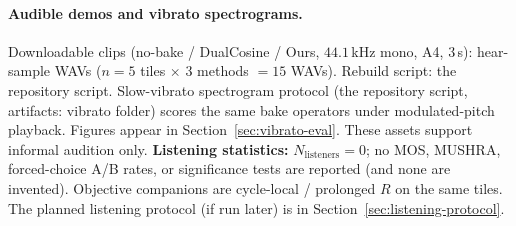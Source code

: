 
\paragraph{Audible demos and vibrato spectrograms.}
Downloadable clips (no-bake / DualCosine / Ours, $44.1$\,kHz mono, A4, $3$\,s):
hear-sample WAVs
($n{=}5$ tiles $\times$ $3$ methods $=15$ WAVs).
Rebuild script:
the repository script.
Slow-vibrato spectrogram protocol
(the repository script,
artifacts:
vibrato folder)
scores the same bake operators under modulated-pitch playback. Figures appear in Section~\ref{sec:vibrato-eval}.
These assets support informal audition only.
\textbf{Listening statistics:} $N_{\mathrm{listeners}}{=}0$; no MOS, MUSHRA, forced-choice A/B rates, or significance tests are reported (and none are invented).
Objective companions are cycle-local / prolonged $R$ on the same tiles.
The planned listening protocol (if run later) is in Section~\ref{sec:listening-protocol}.
